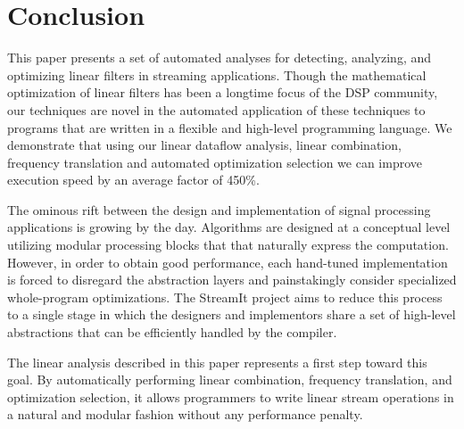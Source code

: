 \section{Conclusion}
\label{sec:conclusion}

This paper presents a set of automated analyses for detecting,
analyzing, and optimizing linear filters in streaming applications.
Though the mathematical optimization of linear filters has been a
longtime focus of the DSP community, our techniques are novel in the
automated application of these techniques to programs that are written
in a flexible and high-level programming language.  We demonstrate
that using our linear dataflow analysis, linear combination, frequency
translation and automated optimization selection we can improve
execution speed by an average factor of 450\%.

The ominous rift between the design and implementation of signal
processing applications is growing by the day.  Algorithms are
designed at a conceptual level utilizing modular processing blocks
that that naturally express the computation.  However, in order to
obtain good performance, each hand-tuned implementation is forced to
disregard the abstraction layers and painstakingly consider
specialized whole-program optimizations. The StreamIt project aims to
reduce this process to a single stage in which the designers and
implementors share a set of high-level abstractions that can be
efficiently handled by the compiler.

The linear analysis described in this paper represents a first step
toward this goal.  By automatically performing linear combination,
frequency translation, and optimization selection, it allows
programmers to write linear stream operations in a natural and modular
fashion without any performance penalty.


